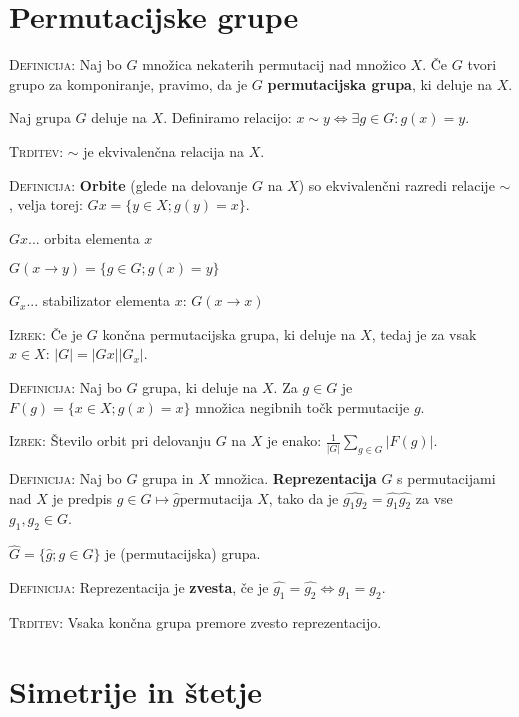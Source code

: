 \documentclass[8pt,a4paper]{amsart}
\theoremstyle{definition} %
\theoremstyle{plain} %
\begin{document}
\thispagestyle{empty}
\setlength{\parindent}{0pt}

\section{Permutacijske grupe}

\textsc{Definicija:} Naj bo $G$ množica nekaterih permutacij nad množico $X$. Če
$G$ tvori grupo za komponiranje, pravimo, da je $G$ \textbf{permutacijska
grupa}, ki deluje na $X$.

Naj grupa $G$ deluje na $X$. Definiramo relacijo: $x \sim y \Longleftrightarrow
\exists g \in G: g(x)=y$.

\textsc{Trditev:} $\sim$ je ekvivalenčna relacija na $X$.

\textsc{Definicija:} \textbf{Orbite} (glede na delovanje $G$ na $X$) so
ekvivalenčni razredi relacije $\sim$, velja torej: $Gx = \{ y \in X; g(y) = x
\}$.

$Gx$... orbita elementa $x$

$G(x \rightarrow y) = \{ g \in G; g(x)=y \}$

$G_x$... stabilizator elementa $x$: $G(x \rightarrow x)$

\textsc{Izrek:} Če je $G$ končna permutacijska grupa, ki deluje na $X$, tedaj je
za vsak $x \in X$:  $|G| = |Gx| |G_x|$.

\textsc{Definicija}: Naj bo $G$ grupa, ki deluje na $X$. Za $g \in G$ je $F(g) =
\{ x\in X; g(x) = x \}$ množica negibnih točk permutacije $g$.

\textsc{Izrek:} Število orbit pri delovanju $G$ na $X$ je enako:  $\frac{1}{|G|}
\sum_{g \in G}|F(g)|$.

\textsc{Definicija:} Naj bo $G$ grupa in $X$ množica. \textbf{Reprezentacija}
$G$ s permutacijami nad $X$ je predpis $g \in G \mapsto \hat{g} \text{
permutacija } X$, tako da je $\widehat{g_1g_2} = \widehat{g_1}\widehat{g_2}$ za
vse $g_1,g_2 \in G$.

$\widehat{G} = \{ \widehat{g} ; g\in G \}$ je (permutacijska) grupa.

\textsc{Definicija:} Reprezentacija je \textbf{zvesta}, če je $\widehat{g_1} =
\widehat{g_2} \Longleftrightarrow g_1 = g_2$.

\textsc{Trditev:} Vsaka končna grupa premore zvesto reprezentacijo.


\section{Simetrije in štetje}
\end{document}
